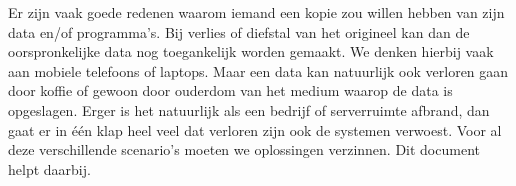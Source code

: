 Er zijn vaak goede redenen waarom iemand een kopie zou willen hebben van zijn data en/of programma's. Bij verlies of diefstal van het origineel kan dan de oorspronkelijke data nog toegankelijk worden gemaakt. We denken hierbij vaak aan mobiele telefoons of laptops. Maar een data kan natuurlijk ook verloren gaan door koffie of gewoon door ouderdom van het medium waarop de data is opgeslagen. Erger is het natuurlijk als een bedrijf of serverruimte afbrand, dan gaat er in \'e\'en klap heel veel dat verloren zijn ook de systemen verwoest. Voor al deze verschillende scenario's moeten we oplossingen verzinnen. Dit document helpt daarbij.


